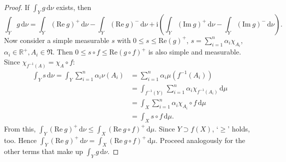 \documentclass[10pt]{article}\usepackage[]{graphicx}\usepackage[]{color}
\newcommand{\R}{\mathbb{R}}
\newcommand{\df}{\,\textrm{d}}
\begin{document}
\begin{proof}
If $\int_Y g \df \nu$ exists, then
\[
  \int_Y g \df \nu = 
  \int_Y (\textrm{Re}~ g)^+ \df \nu
  -  \int_Y (\textrm{Re}~ g)^- \df \nu
  + \textrm{i}\left(\int_Y (\textrm{Im}~ g)^+ \df \nu 
  -  \int_Y (\textrm{Im}~ g)^- \df \nu\right).
\]
Now consider a simple measurable $s$ with 
$0 \leq s \leq \textrm{Re}(g)^+$,
$s = \sum_{i = 1}^n \alpha_i \chi_{A_i}$,
$\alpha_i \in \R^+, A_i \in \mathfrak{N}$.
Then $0 \leq s \circ f \leq \textrm{Re}(g \circ f)^+$
is also simple and measurable.
Since $\chi_{f^{-1}(A)} = \chi_A \circ f$:
\begin{align*}
  \int_Y s \df \nu
  = \int_{Y} \sum_{i = 1}^n \alpha_i \nu(A_i)
  &= \sum_{i = 1}^n \alpha_i \mu(f^{-1}(A_i)) \\
  &= \int_{f^{-1}(Y)} \sum_{i = 1}^n \alpha_i \chi_{f^{-1}(A_i)} \df \mu \\
  &= \int_{X} \sum_{i = 1}^n \alpha_i \chi_{A_i} \circ f \df \mu \\
  &= \int_{X} s \circ f \df \mu.
\end{align*}
From this, $\int_Y (\textrm{Re}~ g)^+ \df \nu \leq \int_X (\textrm{Re}~ g \circ f)^+ \df \mu$.
Since $Y \supset f(X)$, `$\geq$' holds, too.
Hence $\int_Y (\textrm{Re}~ g)^+ \df \nu = \int_X (\textrm{Re}~ g \circ f)^+ \df \mu$.
Proceed analogously for the other terms that make up $\int_Y g \df \nu$.
\end{proof}
\end{document}
